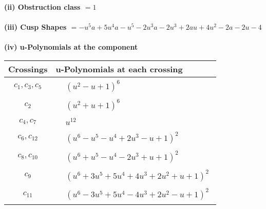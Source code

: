 \documentclass[1p]{elsarticle_modified}
\theoremstyle{definition}
\begin{document}
\flushleft \textbf{(ii) Obstruction class $= 1$}\\~\\
\flushleft \textbf{(iii) Cusp Shapes $= - u^5 a+5 u^4 a- u^5-2 u^3 a-2 u^3+2 a u+4 u^2-2 a-2 u-4$}\\~\\
\newpage\renewcommand{\arraystretch}{1}
\flushleft \textbf{(iv) u-Polynomials at the component}\newline \\
\begin{tabular}{m{50pt}|m{274pt}}
Crossings & \hspace{64pt}u-Polynomials at each crossing \\
\hline $$\begin{aligned}c_{1},c_{3},c_{5}\end{aligned}$$&$\begin{aligned}
&(u^2- u+1)^6
\end{aligned}$\\
\hline $$\begin{aligned}c_{2}\end{aligned}$$&$\begin{aligned}
&(u^2+u+1)^6
\end{aligned}$\\
\hline $$\begin{aligned}c_{4},c_{7}\end{aligned}$$&$\begin{aligned}
&u^{12}
\end{aligned}$\\
\hline $$\begin{aligned}c_{6},c_{12}\end{aligned}$$&$\begin{aligned}
&(u^6- u^5- u^4+2 u^3- u+1)^2
\end{aligned}$\\
\hline $$\begin{aligned}c_{8},c_{10}\end{aligned}$$&$\begin{aligned}
&(u^6+u^5- u^4-2 u^3+u+1)^2
\end{aligned}$\\
\hline $$\begin{aligned}c_{9}\end{aligned}$$&$\begin{aligned}
&(u^6+3 u^5+5 u^4+4 u^3+2 u^2+u+1)^2
\end{aligned}$\\
\hline $$\begin{aligned}c_{11}\end{aligned}$$&$\begin{aligned}
&(u^6-3 u^5+5 u^4-4 u^3+2 u^2- u+1)^2
\end{aligned}$\\
\hline
\end{tabular}\\~\\
\end{document}
